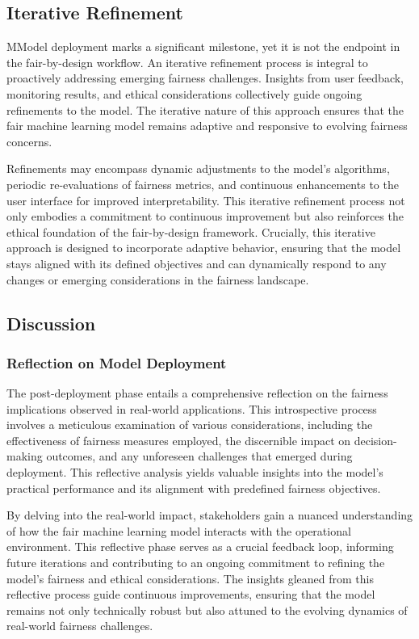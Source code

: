 \subsection{Iterative Refinement}

MModel deployment marks a significant milestone, yet it is not the endpoint in the fair-by-design workflow. An iterative refinement process is integral to proactively addressing emerging fairness challenges. Insights from user feedback, monitoring results, and ethical considerations collectively guide ongoing refinements to the model. The iterative nature of this approach ensures that the fair machine learning model remains adaptive and responsive to evolving fairness concerns.

Refinements may encompass dynamic adjustments to the model's algorithms, periodic re-evaluations of fairness metrics, and continuous enhancements to the user interface for improved interpretability. This iterative refinement process not only embodies a commitment to continuous improvement but also reinforces the ethical foundation of the fair-by-design framework. Crucially, this iterative approach is designed to incorporate adaptive behavior, ensuring that the model stays aligned with its defined objectives and can dynamically respond to any changes or emerging considerations in the fairness landscape.

\subsection{Discussion}

\subsubsection{Reflection on Model Deployment}

The post-deployment phase entails a comprehensive reflection on the fairness implications observed in real-world applications. This introspective process involves a meticulous examination of various considerations, including the effectiveness of fairness measures employed, the discernible impact on decision-making outcomes, and any unforeseen challenges that emerged during deployment. This reflective analysis yields valuable insights into the model's practical performance and its alignment with predefined fairness objectives.

By delving into the real-world impact, stakeholders gain a nuanced understanding of how the fair machine learning model interacts with the operational environment. This reflective phase serves as a crucial feedback loop, informing future iterations and contributing to an ongoing commitment to refining the model's fairness and ethical considerations. The insights gleaned from this reflective process guide continuous improvements, ensuring that the model remains not only technically robust but also attuned to the evolving dynamics of real-world fairness challenges.

